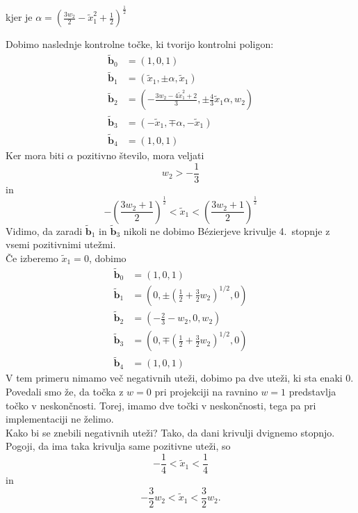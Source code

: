 \documentclass[a4paper,11pt]{article}
\theoremstyle{definition}
\theoremstyle{plain}
\begin{document}
kjer je $\alpha=(\frac{3w_2}{2}-\tilde{x}_1^2+\frac{1}{2})^{\frac{1}{2}}$

Dobimo naslednje kontrolne točke, ki tvorijo kontrolni poligon:
\begin{align*}
\boldsymbol{\tilde{b}}_0 &= (1,0,1) \\
\boldsymbol{\tilde{b}}_1 &= (\tilde{x}_1,\pm\alpha,\tilde{x}_1) \\
\boldsymbol{\tilde{b}}_2 &= (-\frac{3w_2-4\tilde{x}_1^2+2}{3},\pm\frac{4}{3}\tilde{x}_1\alpha,w_2) \\
\boldsymbol{\tilde{b}}_3 &= (-\tilde{x}_1,\mp\alpha,-\tilde{x}_1) \\
\boldsymbol{\tilde{b}}_4 &= (1,0,1)
\end{align*}
\noindent
Ker mora biti $\alpha$ pozitivno število, mora veljati
$$w_2>-\frac{1}{3}$$
in
$$-\left(\frac{3w_2+1}{2}\right)^{\frac{1}{2}}<\tilde{x}_1<\left(\frac{3w_2+1}{2}\right)^{\frac{1}{2}}$$
Vidimo, da zaradi $\boldsymbol{\tilde{b}}_1$ in $\boldsymbol{\tilde{b}}_3$ nikoli ne dobimo B\'ezierjeve krivulje 4.~stopnje z vsemi pozitivnimi utežmi. \\
Če izberemo $\tilde{x}_1=0$, dobimo  
\begin{align*}
\boldsymbol{\tilde{b}}_0 &= (1,0,1) \\
\boldsymbol{\tilde{b}}_1 &= (0,\pm (\frac{1}{2}+\frac{3}{2}w_2)^{1/2},0) \\
\boldsymbol{\tilde{b}}_2 &= (-\frac{2}{3}-w_2,0,w_2) \\
\boldsymbol{\tilde{b}}_3 &= (0,\mp(\frac{1}{2}+\frac{3}{2}w_2)^{1/2},0) \\
\boldsymbol{\tilde{b}}_4 &= (1,0,1)
\end{align*}
V tem primeru nimamo več negativnih uteži, dobimo pa dve uteži, ki sta enaki $0$. Povedali smo že, da točka z $w=0$ pri projekciji na ravnino $w=1$ predstavlja točko v neskončnosti. Torej, imamo dve točki v neskončnosti, tega pa pri implementaciji ne želimo. \\
Kako bi se znebili negativnih uteži? Tako, da dani krivulji dvignemo stopnjo. \\%
Pogoji, da ima taka krivulja same pozitivne uteži, so
$$-\frac{1}{4}<\tilde{x}_1<\frac{1}{4}$$
in
$$-\frac{3}{2}w_2<\tilde{x}_1<\frac{3}{2}w_2.$$
\end{document}
